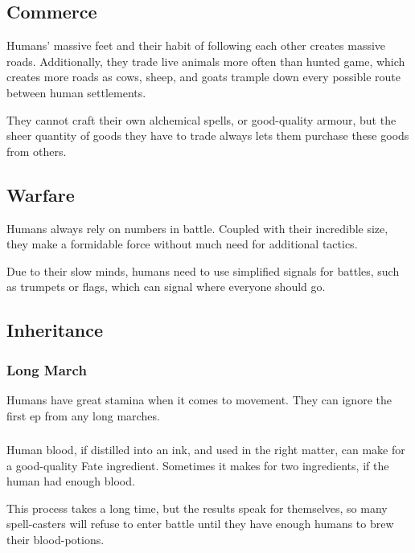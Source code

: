 \begin{multicols}{2}
\subsection{Commerce}

Humans' massive feet and their habit of following each other creates massive roads.
Additionally, they trade live animals more often than hunted game, which creates more roads as cows, sheep, and goats trample down every possible route between human settlements.

They cannot craft their own alchemical spells, or good-quality armour, but the sheer quantity of goods they have to trade always lets them purchase these goods from others.

\subsection{Warfare}
Humans always rely on numbers in battle.
Coupled with their incredible size, they make a formidable force without much need for additional tactics.

Due to their slow minds, humans need to use simplified signals for battles, such as trumpets or flags, which can signal where everyone should go.

\subsection{Inheritance}

\subsubsection[Long March: ignore first \glsentrytext{ep} from exercise]{Long March}
\label{humanInheritance}

Humans have great stamina when it comes to movement.
They can ignore the first \gls{ep} from any long marches.

\subsubsection{}


Human blood, if distilled into an ink, and used in the right matter, can make for a good-quality Fate \gls{ingredient}.
Sometimes it makes for two \glspl{ingredient}, if the human had enough blood.

This process takes a long time, but the results speak for themselves, so many spell-casters will refuse to enter battle until they have enough humans to brew their blood-potions.


\end{multicols}
